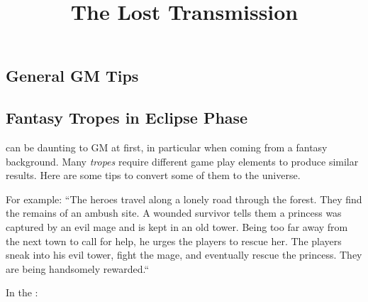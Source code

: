 \documentclass[a4]{book}
\begin{document}
\title{The Lost Transmission}






\begin{multicols}{2}

\section*{General GM Tips}
\subsection*{Fantasy Tropes in Eclipse Phase}


\eclipsephase can be daunting to GM at first, in particular when coming from a fantasy background.
%
Many \textit{tropes} require different game play elements to produce similar results.
%
Here are some tips to convert some of them to the \eclipsephase universe.

\medskip

For example:
``The heroes travel along a lonely road through the forest.
They find the remains of an ambush site.
A wounded survivor tells them a princess was captured by an evil mage and is kept in an old tower.
Being too far away from the next town to call for help, he urges the players to rescue her.
The players sneak into his evil tower, fight the mage, and eventually rescue the princess.
They are being handsomely rewarded.``

In the \eclipsephase:

\end{multicols}
\end{document}
